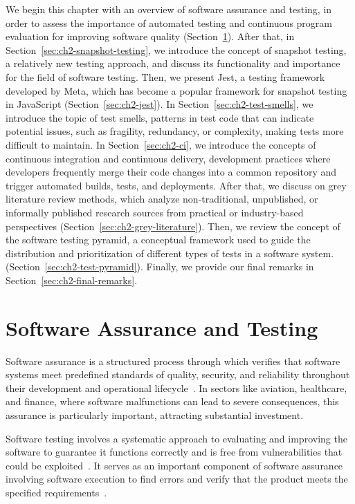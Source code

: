 \documentclass[
	msc, %
	english %
]{../ppgccufmg}
\begin{document}
    We begin this chapter with an overview of software assurance and testing, in order to assess the importance of automated testing and continuous program evaluation for improving software quality (Section~\ref{sec:ch2-software-testing}). After that, in Section~\ref{sec:ch2-snapshot-testing}, we introduce the concept of snapshot testing, a relatively new testing approach, and discuss its functionality and importance for the field of software testing. Then, we present Jest, a testing framework developed by Meta, which has become a popular framework for snapshot testing in JavaScript (Section~\ref{sec:ch2-jest}). In Section~\ref{sec:ch2-test-smells}, we introduce the topic of test smells, patterns in test code that can indicate potential issues, such as fragility, redundancy, or complexity, making tests more difficult to maintain. In Section~\ref{sec:ch2-ci}, we introduce the concepts of continuous integration and continuous delivery, development practices where developers frequently merge their code changes into a common repository and trigger automated builds, tests, and deployments. After that, we discuss on grey literature review methods, which analyze non-traditional, unpublished, or informally published research sources from practical or industry-based perspectives (Section~\ref{sec:ch2-grey-literature}). Then, we review the concept of the software testing pyramid, a  conceptual framework used to guide the distribution and prioritization of different types of tests in a software system.(Section~\ref{sec:ch2-test-pyramid}).  Finally, we provide our final remarks in Section~\ref{sec:ch2-final-remarks}.

    \section{Software Assurance and Testing}\label{sec:ch2-software-testing}

    Software assurance is a structured process through which verifies that software systems meet predefined standards of quality, security, and reliability throughout their development and operational lifecycle~\cite{ross2018nist}. In sectors like aviation, healthcare, and finance, where software malfunctions can lead to severe consequences, this assurance is particularly important, attracting substantial investment.

    Software testing involves a systematic approach to evaluating and improving the software to guarantee it functions correctly and is free from vulnerabilities that could be exploited~\cite{mcgraw2006issre}. It serves as an important component of software assurance involving software execution to find errors and verify that the product meets the specified requirements~\cite{ISO29119-1}.
    
\end{document}
